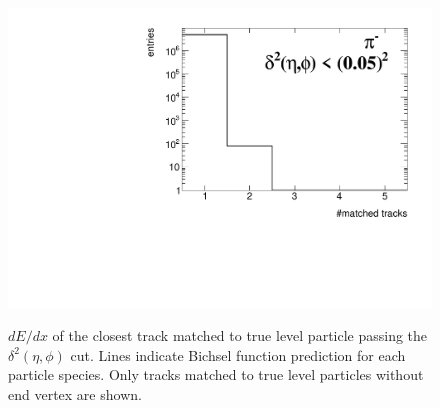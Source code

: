 \begin{figure}[h!]
{		\includegraphics[width=\linewidth,page=26]{graphics/eff/trackSplitting_QualityEtaPhiCD.pdf}\\
	}%
	\caption[$dE/dx$ of the closest track matched to true level particle passing the $\delta^{2}\left(\eta,\phi\right)$ cut.]{$dE/dx$ of the closest track matched to true level particle passing the $\delta^{2}\left(\eta,\phi\right)$ cut. Lines indicate Bichsel function prediction for each particle species. Only tracks matched to true level particles without end vertex  are shown.}\label{fig:trackSplittingEtaPhidEdx}
\end{figure}

